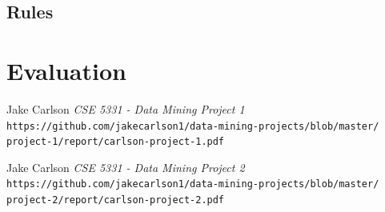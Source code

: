 \documentclass{article}
\begin{document}
    \subsection{Rules}

\section{Evaluation}

\begin{thebibliography}{10}
    Jake Carlson
    \textit{CSE 5331 - Data Mining Project 1}
    \texttt{https://github.com/jakecarlson1/data-mining-projects/blob/master/}
    \texttt{project-1/report/carlson-project-1.pdf}

    Jake Carlson
    \textit{CSE 5331 - Data Mining Project 2}
    \texttt{https://github.com/jakecarlson1/data-mining-projects/blob/master/}
    \texttt{project-2/report/carlson-project-2.pdf}

\end{thebibliography}
\end{document}
